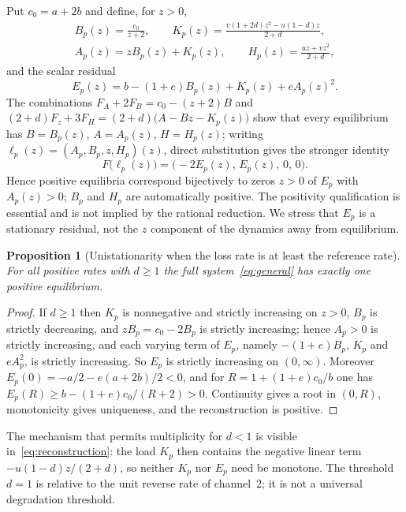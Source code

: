 \documentclass[11pt,a4paper]{article}
\theoremstyle{plain}
\newtheorem{proposition}[theorem]{Proposition}
\theoremstyle{definition}
\theoremstyle{remark}
\begin{document}
Put $c_0=a+2b$ and define, for $z>0$,
\begin{equation}\label{eq:reconstruction}
\begin{gathered}
B_p(z)=\frac{c_0}{z+2},\qquad K_p(z)=\frac{v(1+2d)z^2-u(1-d)z}{2+d},\\
A_p(z)=zB_p(z)+K_p(z),\qquad H_p(z)=\frac{uz+vz^2}{2+d},
\end{gathered}
\end{equation}
and the scalar residual
\begin{equation}\label{eq:E}
E_p(z)=b-(1+e)B_p(z)+K_p(z)+eA_p(z)^2 .
\end{equation}
The combinations $F_A+2F_B=c_0-(z+2)B$ and $(2+d)F_z+3F_H=(2+d)\bigl(A-Bz-K_p(z)\bigr)$ show that every equilibrium has $B=B_p(z)$, $A=A_p(z)$, $H=H_p(z)$; writing $\ell_p(z)=(A_p,B_p,z,H_p)(z)$, direct substitution gives the stronger identity
\begin{equation}\label{eq:field-identity}
F\bigl(\ell_p(z)\bigr)=\bigl(-2E_p(z),\,E_p(z),\,0,\,0\bigr).
\end{equation}
Hence positive equilibria correspond bijectively to zeros $z>0$ of $E_p$ with $A_p(z)>0$; $B_p$ and $H_p$ are automatically positive. The positivity qualification is essential and is not implied by the rational reduction. We stress that $E_p$ is a stationary residual, not the $z$ component of the dynamics away from equilibrium.

\begin{proposition}[Unistationarity when the loss rate is at least the reference rate]\label{prop:preservation}
For all positive rates with $d\ge1$ the full system~\eqref{eq:general} has exactly one positive equilibrium.
\end{proposition}
\begin{proof}
If $d\ge1$ then $K_p$ is nonnegative and strictly increasing on $z>0$, $B_p$ is strictly decreasing, and $zB_p=c_0-2B_p$ is strictly increasing; hence $A_p>0$ is strictly increasing, and each varying term of $E_p$, namely $-(1+e)B_p$, $K_p$ and $eA_p^2$, is strictly increasing. So $E_p$ is strictly increasing on $(0,\infty)$. Moreover $E_p(0)=-a/2-e(a+2b)/2<0$, and for $R=1+(1+e)c_0/b$ one has $E_p(R)\ge b-(1+e)c_0/(R+2)>0$. Continuity gives a root in $(0,R)$, monotonicity gives uniqueness, and the reconstruction is positive.
\end{proof}

The mechanism that permits multiplicity for $d<1$ is visible in~\eqref{eq:reconstruction}: the load $K_p$ then contains the negative linear term $-u(1-d)z/(2+d)$, so neither $K_p$ nor $E_p$ need be monotone. The threshold $d=1$ is relative to the unit reverse rate of channel~2; it is not a universal degradation threshold.
\end{document}
